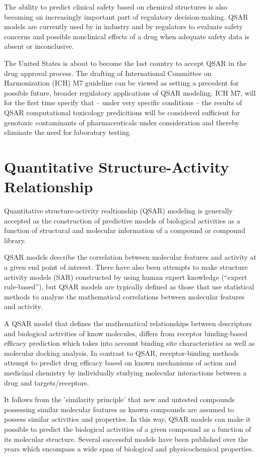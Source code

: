 The ability to predict clinical safety based on chemical structures is also becoming an increasingly important part of regulatory decision-making. QSAR models are currently used by in industry and by regulators to evaluate safety concerns and possible nonclinical effects of a drug when adequate safety data is absent or inconclusive.\cite{Kruhlak2012}

The United States is about to become the last country to accept QSAR in the drug approval process. The drafting of International Committee on Harmonization (ICH) M7 guideline can be viewed as setting a precedent for possible future, broader regulatory applications of QSAR modeling. ICH M7, will for the first time specify that -- under very specific conditions -- the results of QSAR computational toxicology predicitions will be considered sufficient for genotoxic contaminants of pharmaceuticals under consideration and thereby eliminate the need for laboratory testing. \cite{Kruhlak2012}


\section{Quantitative Structure-Activity Relationship}

Quantitative structure-activity realtionship (QSAR) modeling is generally accepted as the construction of predictive models of biological activities as a function of structural and molecular information of a compound or compound library. \cite{Nantasenamat2009}

QSAR models describe the correlation between molecular features and activity at a given end point of interest. There have also been attempts to make structure activity models (SAR) constructed by using human expert knowledge (“expert rule-based”), but QSAR models are typically defined as those that use statistical methods to analyze the mathematical correlations between molecular features and activity. 

A QSAR model that defines the mathematical relationships between descriptors and biological activities of know molecules, differs from receptor binding-based efficacy prediction which takes into account binding site characteristics as well as molecular docking analysis. In contrast to QSAR, receptor-binding methods attempt to predict drug efficacy based on known mechanisms of action and medicinal chemistry by individually studying molecular interactions between a drug and targets/receptors. \cite{Kruhlak2012}

It follows from the 'similarity principle' that new and untested compounds possessing similar molecular features as known compounds are assumed to possess similar activities and properties. In this way, QSAR models can make it possible to predict the biological activities of a given compound as a function of its molecular structure. Several successful models have been published over the years which encompass a wide span of biological and physicochemical properties.

